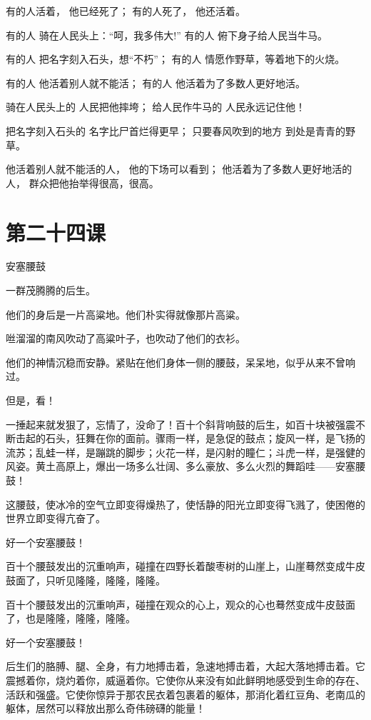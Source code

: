 \documentclass[12pt,UTF8]{ctexbook}
\begin{document}
有的人活着，
他已经死了；
有的人死了，
他还活着。

有的人
骑在人民头上：“呵，我多伟大!”
有的人
俯下身子给人民当牛马。

有的人
把名字刻入石头，想“不朽”；
有的人
情愿作野草，等着地下的火烧。

有的人
他活着别人就不能活；
有的人
他活着为了多数人更好地活。

骑在人民头上的
人民把他摔垮；
给人民作牛马的
人民永远记住他！

把名字刻入石头的
名字比尸首烂得更早；
只要春风吹到的地方
到处是青青的野草。

他活着别人就不能活的人，
他的下场可以看到；
他活着为了多数人更好地活的人，
群众把他抬举得很高，很高。

\section{第二十四课}

安塞腰鼓

一群茂腾腾的后生。

他们的身后是一片高粱地。他们朴实得就像那片高粱。

咝溜溜的南风吹动了高粱叶子，也吹动了他们的衣衫。

他们的神情沉稳而安静。紧贴在他们身体一侧的腰鼓，呆呆地，似乎从来不曾响过。

但是，看！

一捶起来就发狠了，忘情了，没命了！百十个斜背响鼓的后生，如百十块被强震不断击起的石头，狂舞在你的面前。骤雨一样，是急促的鼓点；旋风一样，是飞扬的流苏；乱蛙一样，是蹦跳的脚步；火花一样，是闪射的瞳仁；斗虎一样，是强健的风姿。黄土高原上，爆出一场多么壮阔、多么豪放、多么火烈的舞蹈哇——安塞腰鼓！

这腰鼓，使冰冷的空气立即变得燥热了，使恬静的阳光立即变得飞溅了，使困倦的世界立即变得亢奋了。

好一个安塞腰鼓！

百十个腰鼓发出的沉重响声，碰撞在四野长着酸枣树的山崖上，山崖蓦然变成牛皮鼓面了，只听见隆隆，隆隆，隆隆。

百十个腰鼓发出的沉重响声，碰撞在观众的心上，观众的心也蓦然变成牛皮鼓面了，也是隆隆，隆隆，隆隆。

好一个安塞腰鼓！

后生们的胳膊、腿、全身，有力地搏击着，急速地搏击着，大起大落地搏击着。它震撼着你，烧灼着你，威逼着你。它使你从来没有如此鲜明地感受到生命的存在、活跃和强盛。它使你惊异于那农民衣着包裹着的躯体，那消化着红豆角、老南瓜的躯体，居然可以释放出那么奇伟磅礴的能量！
\end{document}
